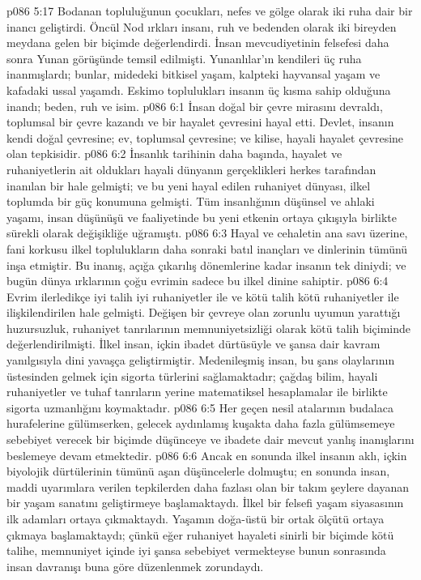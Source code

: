 \vs p086 5:17 Bodanan topluluğunun çocukları, nefes ve gölge olarak iki ruha dair bir inancı geliştirdi. Öncül Nod ırkları insanı, ruh ve bedenden olarak iki bireyden meydana gelen bir biçimde değerlendirdi. İnsan mevcudiyetinin felsefesi daha sonra Yunan görüşünde temsil edilmişti. Yunanlılar’ın kendileri üç ruha inanmışlardı; bunlar, midedeki bitkisel yaşam, kalpteki hayvansal yaşam ve kafadaki ussal yaşamdı. Eskimo toplulukları insanın üç kısma sahip olduğuna inandı; beden, ruh ve isim.
\vs p086 6:1 İnsan doğal bir çevre mirasını devraldı, toplumsal bir çevre kazandı ve bir hayalet çevresini hayal etti. Devlet, insanın kendi doğal çevresine; ev, toplumsal çevresine; ve kilise, hayali hayalet çevresine olan tepkisidir.
\vs p086 6:2 İnsanlık tarihinin daha başında, hayalet ve ruhaniyetlerin ait oldukları hayali dünyanın gerçeklikleri herkes tarafından inanılan bir hale gelmişti; ve bu yeni hayal edilen ruhaniyet dünyası, ilkel toplumda bir güç konumuna gelmişti. Tüm insanlığının düşünsel ve ahlaki yaşamı, insan düşünüşü ve faaliyetinde bu yeni etkenin ortaya çıkışıyla birlikte sürekli olarak değişikliğe uğramıştı.
\vs p086 6:3 Hayal ve cehaletin ana savı üzerine, fani korkusu ilkel toplulukların daha sonraki batıl inançları ve dinlerinin tümünü inşa etmiştir. Bu inanış, açığa çıkarılış dönemlerine kadar insanın tek diniydi; ve bugün dünya ırklarının çoğu evrimin sadece bu ilkel dinine sahiptir.
\vs p086 6:4 Evrim ilerledikçe iyi talih iyi ruhaniyetler ile ve kötü talih kötü ruhaniyetler ile ilişkilendirilen hale gelmişti. Değişen bir çevreye olan zorunlu uyumun yarattığı huzursuzluk, ruhaniyet tanrılarının memnuniyetsizliği olarak kötü talih biçiminde değerlendirilmişti. İlkel insan, içkin ibadet dürtüsüyle ve şansa dair kavram yanılgısıyla dini yavaşça geliştirmiştir. Medenileşmiş insan, bu şans olaylarının üstesinden gelmek için sigorta türlerini sağlamaktadır; çağdaş bilim, hayali ruhaniyetler ve tuhaf tanrıların yerine matematiksel hesaplamalar ile birlikte sigorta uzmanlığını koymaktadır.
\vs p086 6:5 Her geçen nesil atalarının budalaca hurafelerine gülümserken, gelecek aydınlamış kuşakta daha fazla gülümsemeye sebebiyet verecek bir biçimde düşünceye ve ibadete dair mevcut yanlış inanışlarını beslemeye devam etmektedir.
\vs p086 6:6 Ancak en sonunda ilkel insanın aklı, içkin biyolojik dürtülerinin tümünü aşan düşüncelerle dolmuştu; en sonunda insan, maddi uyarımlara verilen tepkilerden daha fazlası olan bir takım şeylere dayanan bir yaşam sanatını geliştirmeye başlamaktaydı. İlkel bir felsefi yaşam siyasasının ilk adamları ortaya çıkmaktaydı. Yaşamın doğa\hyp{}üstü bir ortak ölçütü ortaya çıkmaya başlamaktaydı; çünkü eğer ruhaniyet hayaleti sinirli bir biçimde kötü talihe, memnuniyet içinde iyi şansa sebebiyet vermekteyse bunun sonrasında insan davranışı buna göre düzenlenmek zorundaydı.
